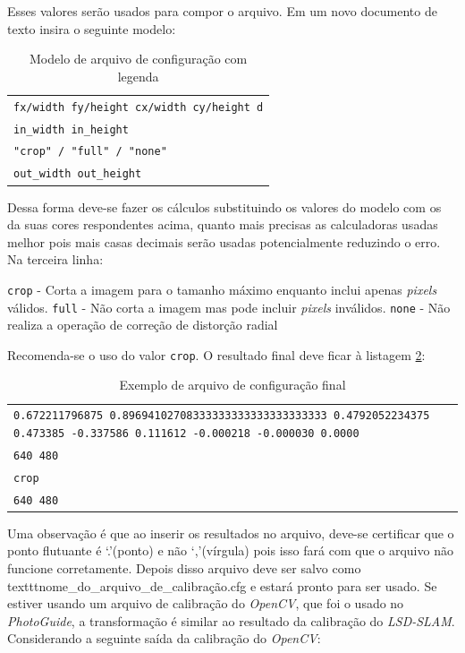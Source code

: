 Esses valores serão usados para compor o arquivo. Em um novo documento de texto insira o seguinte modelo:

\begin{table}[!ht]\label{tb:7}
\begin{tabular}{| p{\textwidth}|}
\hline
\texttt{fx/width fy/height cx/width cy/height d}\\
\texttt{in\_width in\_height}\\
\texttt{"crop" / "full" / "none"}\\
\texttt{out\_width out\_height}\\
\hline
\end{tabular}
\caption{Modelo de arquivo de configuração com legenda}
\end{table}

Dessa forma deve-se fazer os cálculos substituindo os valores do modelo com os da suas cores respondentes acima, quanto mais precisas as calculadoras usadas melhor pois mais casas decimais serão usadas potencialmente reduzindo o erro. Na terceira linha:

\texttt{crop} - Corta a imagem para o tamanho máximo enquanto inclui apenas \textit{pixels} válidos.
\texttt{full} - Não corta a imagem mas pode incluir \textit{pixels} inválidos.
\texttt{none} - Não realiza a operação de correção de distorção radial

Recomenda-se o uso do valor \texttt{crop}. O resultado final deve ficar à listagem \ref{tb:8}:

\begin{table}[!ht]\label{tb:8}
\begin{tabular}{| p{\textwidth}|}
\hline
\texttt{0.672211796875 0.89694102708333333333333333333333 0.4792052234375 0.473385 -0.337586 0.111612 -0.000218 -0.000030 0.0000}\\
\texttt{640 480}\\
\texttt{crop}\\
\texttt{640 480}\\
\hline
\end{tabular}
\caption{Exemplo de arquivo de configuração final}
\end{table}

Uma observação é que ao inserir os resultados no arquivo, deve-se certificar que o ponto flutuante é ‘.’(ponto) e não ‘,’(vírgula) pois isso fará com que o arquivo não funcione corretamente. Depois disso arquivo deve ser salvo como texttt{nome\_do\_arquivo\_de\_calibração.cfg} e estará pronto para ser usado. Se estiver usando um arquivo de calibração do \textit{OpenCV}, que foi o usado no \textit{PhotoGuide}, a transformação é similar ao resultado da calibração do \textit{LSD-SLAM}. Considerando a seguinte saída da calibração do \textit{OpenCV}:

